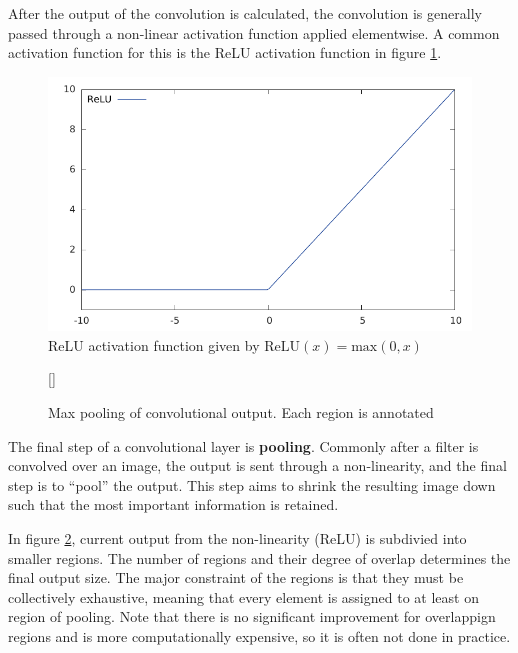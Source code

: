 \message{ !name(main.tex)}\documentclass[11pt]{article}
\begin{document}
After the output of the convolution is calculated, the convolution is generally passed through a non-linear activation function applied elementwise. A common activation function for this is the ReLU activation function in figure \ref{fig:relu}.

\begin{minipage}{0.47\linewidth}
  \centering
  \begin{figure}[H]
    \includegraphics[width=\linewidth]{relu}
    \caption{ReLU activation function given by $\mathrm{ReLU}(x) = \mathrm{max}(0,x)$}
    \label{fig:relu}
  \end{figure}
\end{minipage}\hfill
\begin{minipage}{0.47\linewidth}
  \begin{figure}[H]
    [\FBwidth]
    {\caption{Max pooling of convolutional output. Each region is annotated}\label{fig:pool_ex}}{
    }
  \end{figure}
\end{minipage}\vspace{0.5cm}

The final step of a convolutional layer is \textbf{pooling}. Commonly after a filter is convolved over an image, the output is sent through a non-linearity, and the final step is to ``pool'' the output. This step aims to shrink the resulting image down such that the most important information is retained.

In figure \ref{fig:pool_ex}, current output from the non-linearity (ReLU) is subdivied into smaller regions. The number of regions and their degree of overlap determines the final output size. The major constraint of the regions is that they must be collectively exhaustive, meaning that every element is assigned to at least on region of pooling. Note that there is no significant improvement for overlappign regions \cite{scherer2010evaluation} and is more computationally expensive, so it is often not done in practice.
\end{document}
